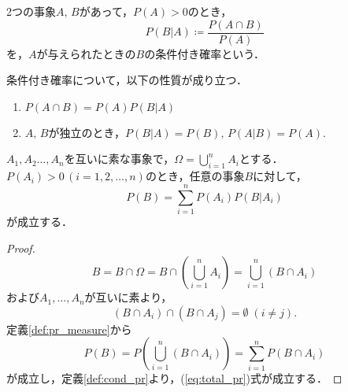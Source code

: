 \documentclass{jsreport}
\begin{document}
\begin{screen}
  \begin{defi}[条件付き確率]\label{def:cond_pr}
    2つの事象$A, \, B$があって，$P(A) > 0$のとき，
    \begin{equation}
      P(B|A) \coloneqq \frac{P(A \cap B)}{P(A)} \nonumber
    \end{equation}
    を，$A$が与えられたときの$B$の条件付き確率という．
  \end{defi}
\end{screen}
条件付き確率について，以下の性質が成り立つ．
\begin{enumerate}
  \item $P(A \cap B) = P(A) P(B|A)$
  \item $A, \, B$が独立のとき，$P(B|A) = P(B), \, P(A|B) = P(A)$.
\end{enumerate}

\begin{screen}
  \begin{theo}[全確率の法則]\label{theo:total_pr}
    $A_1, A_2 \ldots, A_n$を互いに素な事象で，$\Omega = \bigcup_{i = 1}^n A_i$とする．
    $P(A_i) > 0 \, (i = 1, 2, \ldots, n)$のとき，任意の事象$B$に対して，
    \begin{equation}\label{eq:total_pr}
      P(B) = \sum_{i = 1}^n P(A_i) P(B | A_i)
    \end{equation}
    が成立する．
  \end{theo}
\end{screen}

\begin{proof}
  \begin{equation}
    B = B \cap \Omega = B \cap \left(\bigcup_{i = 1}^n A_i\right) = \bigcup_{i = 1}^n (B \cap A_i) \nonumber
  \end{equation}
  および$A_1, \ldots, A_n$が互いに素より，
  \begin{equation}
    (B \cap A_i) \cap (B \cap A_j) = \emptyset \; (i \neq j). \nonumber
  \end{equation}
  定義\ref{def:pr_measure}から
  \begin{equation}
    P(B) = P\left(\bigcup_{i = 1}^n (B \cap A_i)\right) = \sum_{i = 1}^n P(B \cap A_i) \nonumber
  \end{equation}
  が成立し，定義\ref{def:cond_pr}より，(\ref{eq:total_pr})式が成立する．
\end{proof}
\end{document}

